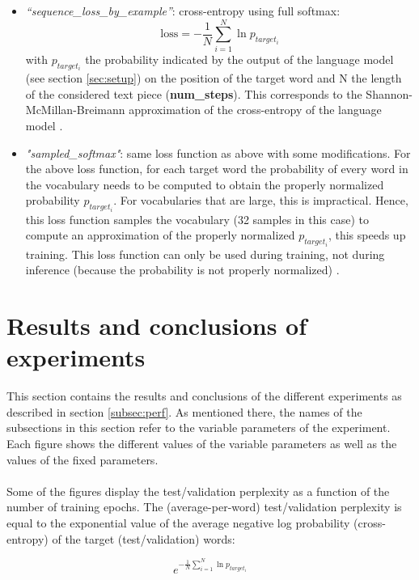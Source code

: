 \documentclass[10pt,a4paper,titlepage]{article}
\begin{document}
\begin{itemize}
	
	\item \textit{``sequence\_loss\_by\_example''}: cross-entropy using full softmax:
	\[ \text{loss} = -\frac{1}{N} \sum_{i=1}^{N} \ln p_{target_{i}} \]
	\noindent
	with $p_{target_{i}}$ the probability indicated by the output of the language model (see section \ref{sec:setup}) on the position of the target word and N the length of the considered text piece (\textbf{num\_steps}). This corresponds to the Shannon-McMillan-Breimann approximation of the cross-entropy of the language model \cite{cross}.
	
	\item \textit{"sampled\_softmax"}: same loss function as above with some modifications. For the above loss function, for each target word the probability of every word in the vocabulary needs to be computed to obtain  the properly normalized probability $p_{target_{i}}$. For vocabularies that are large, this is impractical. Hence, this loss function samples the vocabulary (32 samples in this case) to compute an approximation of the properly normalized $p_{target_{i}}$, this speeds up training. This loss function can only be used during training, not during inference (because the probability is not properly normalized) \cite{sampled}.
	
\end{itemize}

\section{Results and conclusions of experiments}
\label{sec:results}

This section contains the results and conclusions of the different experiments as described in section \ref{subsec:perf}. As mentioned there, the names of the subsections in this section refer to the variable parameters of the experiment. Each figure shows the different values of the variable parameters as well as the values of the fixed parameters.\\
\\
Some of the figures display the test/validation perplexity as a function of the number of training epochs. The (average-per-word) test/validation perplexity is equal to the exponential value of the average negative log probability (cross-entropy) of the target (test/validation) words:

\[ e^{-\frac{1}{N} \sum_{i=1}^{N} \ln p_{target_{i}}} \]
\end{document}
